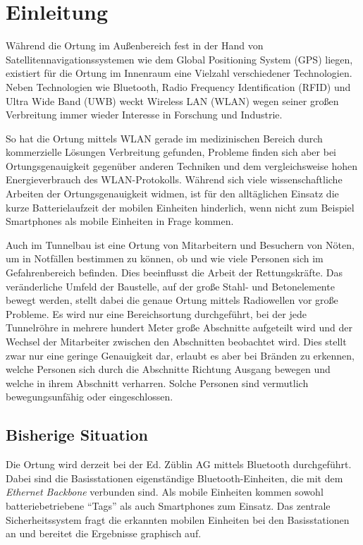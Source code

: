 \chapter{Einleitung}
\label{ch:Einleitung}
Während die Ortung im Außenbereich fest in der Hand von Satellitennavigationssystemen wie dem Global Positioning System (GPS) liegen, existiert für die Ortung im Innenraum eine Vielzahl verschiedener Technologien. Neben Technologien wie Bluetooth, Radio Frequency Identification (RFID) und Ultra Wide Band (UWB) weckt Wireless LAN (WLAN) wegen seiner großen Verbreitung immer wieder Interesse in Forschung und Industrie.

So hat die Ortung mittels WLAN gerade im medizinischen Bereich durch kommerzielle Lösungen Verbreitung gefunden, Probleme finden sich aber bei Ortungsgenauigkeit gegenüber anderen Techniken und dem vergleichsweise hohen Energieverbrauch des WLAN-Protokolls.
Während sich viele wissenschaftliche Arbeiten der Ortungsgenauigkeit widmen, ist für den alltäglichen Einsatz die kurze Batterielaufzeit der mobilen Einheiten hinderlich, wenn nicht zum Beispiel Smartphones als mobile Einheiten in Frage kommen.

Auch im Tunnelbau ist eine Ortung von Mitarbeitern und Besuchern von Nöten, um in Notfällen bestimmen zu können, ob und wie viele Personen sich im Gefahrenbereich befinden.
Dies beeinflusst die Arbeit der Rettungskräfte.
Das veränderliche Umfeld der Baustelle, auf der große Stahl- und Betonelemente bewegt werden, stellt dabei die genaue Ortung mittels Radiowellen vor große Probleme.
Es wird nur eine Bereichsortung durchgeführt, bei der jede Tunnelröhre in mehrere hundert Meter große Abschnitte aufgeteilt wird und der Wechsel der Mitarbeiter zwischen den Abschnitten beobachtet wird.
Dies stellt zwar nur eine geringe Genauigkeit dar, erlaubt es aber bei Bränden zu erkennen, welche Personen sich durch die Abschnitte Richtung Ausgang bewegen und welche in ihrem Abschnitt verharren.
Solche Personen sind vermutlich bewegungsunfähig oder eingeschlossen.


\section{Bisherige Situation}
Die Ortung wird derzeit bei der Ed. Züblin AG mittels Bluetooth durchgeführt.
Dabei sind die Basisstationen eigenständige Bluetooth-Einheiten, die mit dem \emph{Ethernet Backbone} verbunden sind.
Als mobile Einheiten kommen sowohl batteriebetriebene "`Tags"' als auch Smartphones zum Einsatz.
Das zentrale Sicherheitssystem fragt die erkannten mobilen Einheiten bei den Basisstationen an und bereitet die Ergebnisse graphisch auf.

